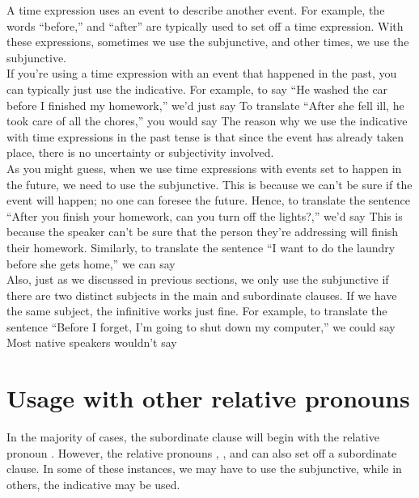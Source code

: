 A time expression uses an event to describe another event. For example, the words ``before,'' and ``after'' are typically used to set off a time expression. With these expressions, sometimes we use the subjunctive, and other times, we use the subjunctive. \\

	If you're using a time expression with an event that happened in the past, you can typically just use the indicative. For example, to say ``He washed the car before I finished my homework,'' we'd just say  To translate ``After she fell ill, he took care of all the chores,'' you would say  The reason why we use the indicative with time expressions in the past tense is that since the event has already taken place, there is no uncertainty or subjectivity involved. \\

As you might guess, when we use time expressions with events set to happen in the future, we need to use the subjunctive. This is because we can't be sure if the event will happen; no one can foresee the future. Hence, to translate the sentence ``After you finish your homework, can you turn off the lights?,'' we'd say  This is because the speaker can't be sure that the person they're addressing will finish their homework. Similarly, to translate the sentence ``I want to do the laundry before she gets home,'' we can say  \\

Also, just as we discussed in previous sections, we only use the subjunctive if there are two distinct subjects in the main and subordinate clauses. If we have the same subject, the infinitive works just fine. For example, to translate the sentence ``Before I forget, I'm going to shut down my computer,'' we could say  Most native speakers wouldn't say  \\

\section{Usage with other relative pronouns}

In the majority of cases, the subordinate clause will begin with the relative pronoun . However, the relative pronouns , , and  can also set off a subordinate clause. In some of these instances, we may have to use the subjunctive, while in others, the indicative may be used. \\

